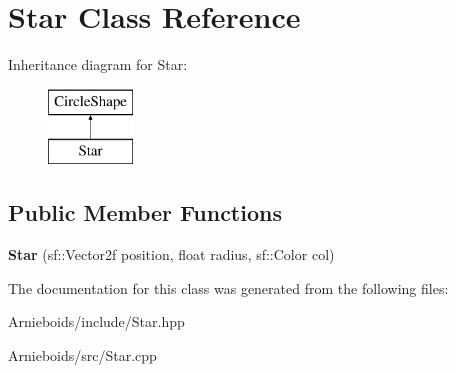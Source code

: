 \hypertarget{class_star}{}\section{Star Class Reference}
\label{class_star}
Inheritance diagram for Star\+:\begin{figure}[H]
\begin{center}
\leavevmode
\includegraphics[height=2.000000cm]{class_star}
\end{center}
\end{figure}
\subsection*{Public Member Functions}
\begin{DoxyCompactItemize}
\item 
\hypertarget{class_star_aecbfd462227e97463c78b51926f831bb}{}{\bfseries Star} (sf\+::\+Vector2f position, float radius, sf\+::\+Color col)\label{class_star_aecbfd462227e97463c78b51926f831bb}

\end{DoxyCompactItemize}


The documentation for this class was generated from the following files\+:\begin{DoxyCompactItemize}
\item 
Arnieboids/include/Star.\+hpp\item 
Arnieboids/src/Star.\+cpp\end{DoxyCompactItemize}
